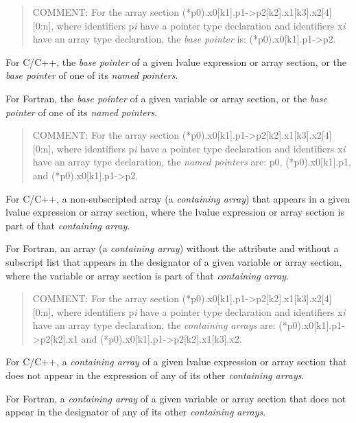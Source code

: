\begin{quote}
COMMENT: For the array section (*p0).x0[k1].p1->p2[k2].x1[k3].x2[4][0:n],
where identifiers p\emph{i} have a pointer type declaration
and identifiers x\emph{i} have an array type declaration, the 
\emph{base pointer} is: (*p0).x0[k1].p1->p2.
\end{quote}
\glossarydefend

\glossarydefstart
For C/C++, the \emph{base pointer} of a given lvalue expression or 
array section, or the \emph{base pointer} of one of its \emph{named pointers}.

For Fortran, the \emph{base pointer} of a given variable or array section, or
the \emph{base pointer} of one of its \emph{named pointers}.

\begin{quote}
COMMENT: For the array section (*p0).x0[k1].p1->p2[k2].x1[k3].x2[4][0:n],
where identifiers p\emph{i} have a pointer type declaration
and identifiers x\emph{i} have an array type declaration, the 
\emph{named pointers} are: 
p0, 
(*p0).x0[k1].p1,
and 
(*p0).x0[k1].p1->p2.
\end{quote}
\glossarydefend

\glossarydefstart
For C/C++, a non-subscripted array (a \emph{containing array}) that appears in
a given lvalue expression or array section, where the lvalue expression or
array section is part of that \emph{containing array}.

For Fortran, an array (a \emph{containing array}) without the 
attribute and without a subscript list that appears in the designator of a
given variable or array section, where the variable or array section is part
of that \emph{containing array}.

\begin{quote}
COMMENT: For the array section (*p0).x0[k1].p1->p2[k2].x1[k3].x2[4][0:n],
where identifiers p\emph{i} have a pointer type declaration
and identifiers x\emph{i} have an array type declaration, 
the \emph{containing arrays} are:
    (*p0).x0[k1].p1->p2[k2].x1
and 
(*p0).x0[k1].p1->p2[k2].x1[k3].x2.
\end{quote}
\glossarydefend

\glossarydefstart
For C/C++, a \emph{containing array} of a given lvalue expression or 
array section that does not appear in the expression of any of its 
other \emph{containing arrays}.

For Fortran, a \emph{containing array} of a given variable or array section
that does not appear in the designator of any of its other 
\emph{containing arrays}.

